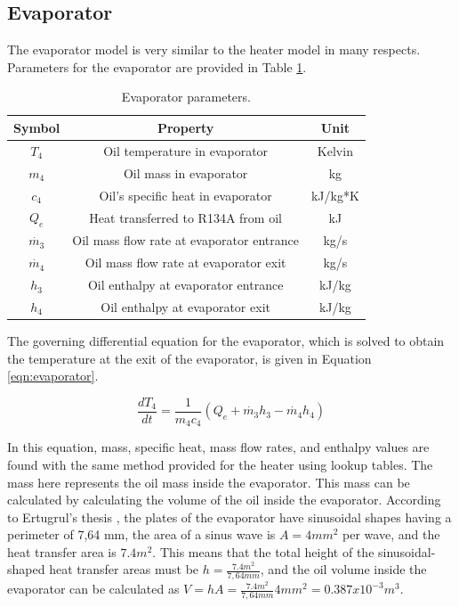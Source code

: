 \subsection{Evaporator}
The evaporator model is very similar to the heater model in many respects. Parameters for the evaporator are provided in Table \ref{tab:evaporator}.

\begin{table}[h]
    \centering
    \caption{Evaporator parameters.}
    \label{tab:evaporator}
    \begin{tabular}{|c|c|c|}
        \hline
        \textbf{Symbol} & \textbf{Property}                         & \textbf{Unit} \\
        \hline
        $T_{4}$         & Oil temperature in evaporator             & Kelvin \\
        $m_{4}$         & Oil mass in evaporator                    & kg \\
        $c_{4}$         & Oil's specific heat in evaporator         & kJ/kg*K \\
        $Q_{e}$         & Heat transferred to R134A from oil        & kJ \\
        $\dot{m_{3}}$   & Oil mass flow rate at evaporator entrance & kg/s \\
        $\dot{m_{4}}$   & Oil mass flow rate at evaporator exit     & kg/s \\
        $h_{3}$         & Oil enthalpy at evaporator entrance       & kJ/kg \\
        $h_{4}$         & Oil enthalpy at evaporator exit           & kJ/kg \\
        \hline
    \end{tabular}
\end{table}

The governing differential equation for the evaporator, which is solved to obtain the temperature at the exit of the evaporator, is given in Equation \ref{eqn:evaporator}.

\begin{equation}
    \label{eqn:evaporator}
    \frac{dT_{4}}{dt} = \frac{1}{m_{4}c_{4}}(Q_{e} + \dot{m_{3}}h_{3} - \dot{m_{4}}h_{4})
\end{equation}

In this equation, mass, specific heat, mass flow rates, and enthalpy values are found with the same method provided for the heater using lookup tables. The mass here represents the oil mass inside the evaporator. This mass can be calculated by calculating the volume of the oil inside the evaporator. According to Ertugrul's thesis \cite{altun}, the plates of the evaporator have sinusoidal shapes having a perimeter of 7,64 mm, the area of a sinus wave is $A = 4 mm^2$ per wave, and the heat transfer area is $7.4 m^2$. This means that the total height of the sinusoidal-shaped heat transfer areas must be $h = \frac{7.4 m^2}{7,64 mm}$, and the oil volume inside the evaporator can be calculated as $V = h A = \frac{7.4 m^2}{7,64 mm} 4 mm^2 = 0.387 x 10^{-3} m^3$.

